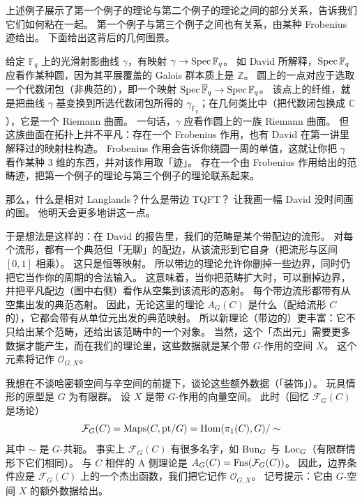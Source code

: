 上述例子展示了第一个例子的理论与第二个例子的理论之间的部分关系，告诉我们它们如何粘在一起。
第一个例子与第三个例子之间也有关系，由某种 Frobenius 迹给出。
下面给出这背后的几何图景。


给定 $\mathbb F_q$ 上的光滑射影曲线 $\gamma$，有映射 $\gamma\to\operatorname{Spec}\mathbb F_q$。
如 David 所解释，$\operatorname{Spec}\mathbb F_q$ 应看作某种圆，因为其平展覆盖的 Galois 群本质上是 $\mathbb Z$。
圆上的一点对应于选取一个代数闭包（非典范的），即一个映射 $\operatorname{Spec}\overline{\mathbb F}_q\to\operatorname{Spec}\mathbb F_q$。
该点上的纤维，就是把曲线 $\gamma$ 基变换到所选代数闭包所得的 $\gamma_{\overline{\mathbb F}_q}$；在几何类比中（把代数闭包换成 $\mathbb C$），它是一个 Riemann 曲面。
一句话，$\gamma$ 应看作圆上的一族 Riemann 曲面。
但这族曲面在拓扑上并不平凡：存在一个 Frobenius 作用，也有 David 在第一讲里解释过的映射柱构造。
Frobenius 作用会告诉你绕圆一周的单值，这就让你把 $\gamma$ 看作某种 3 维的东西，并对该作用取「迹」。
存在一个由 Frobenius 作用给出的范畴迹，把第一个例子的理论与第三个例子的理论联系起来。

那么，什么是相对 Langlands？什么是带边 TQFT？
让我画一幅 David 没时间画的图。
他明天会更多地讲这一点。

于是想法是这样的：在 David 的报告里，我们的范畴是某个带配边的流形。
对每个流形，都有一个典范但「无聊」的配边，从该流形到它自身（把流形与区间 $[0,1]$ 相乘）。
这只是恒等映射。
所以带边的理论允许你删掉一些边界，同时仍把它当作你的周期的合法输入。
这意味着，当你把范畴扩大时，可以删掉边界，并把平凡配边（图中右侧）看作从空集到该流形的态射。
每个带边流形都带有从空集出发的典范态射。
因此，无论这里的理论 $A_G(C)$ 是什么（配给流形 $C$ 的），它都会带有从单位元出发的典范映射。
所以新理论（带边的）更丰富：它不只给出某个范畴，还给出该范畴中的一个对象。
当然，这个「杰出元」需要更多数据才能产生，而在我们的理论里，这些数据就是某个带 $G$-作用的空间 $X$。
这个元素将记作 $\mathcal O_{G,X}$。

我想在不谈哈密顿空间与辛空间的前提下，谈论这些额外数据（「装饰」）。
玩具情形的原型是 $G$ 为有限群。
设 $X$ 是带 $G$-作用的向量空间。
此时（回忆 $\mathcal F_G(C)$ 是场论）
\[
  \mathcal F_G(C)=\operatorname{Maps}(C,\mathrm{pt}/G)=\operatorname{Hom}(\pi_1(C),G)/\sim
\]
其中 $\sim$ 是 $G$-共轭。
事实上 $\mathcal F_G(C)$ 有很多名字，如 $\operatorname{Bun}_G$ 与 $\operatorname{Loc}_G$（有限群情形下它们相同）。
与 $C$ 相伴的 A 侧理论是 $A_G(C)=\operatorname{Fns}(\mathcal F_G(C))$。
因此，边界条件应是 $\mathcal F_G(C)$ 上的一个杰出函数，我们把它记作 $\mathcal O_{G,X}$。
记号提示：它由 $G$-空间 $X$ 的额外数据给出。

